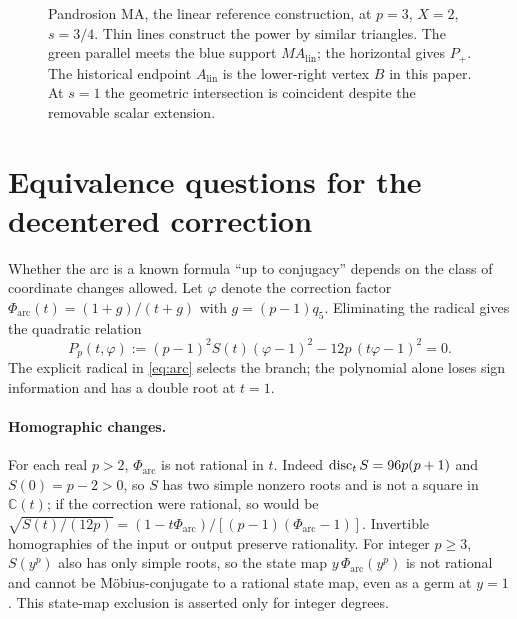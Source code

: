 \begin{figure}[h]
\centering\figMA
\caption{Pandrosion MA, the linear reference construction, at $p=3$, $X=2$, $s=3/4$. Thin lines
construct the power by similar triangles. The green parallel meets the blue support
$MA_{\mathrm{lin}}$; the horizontal gives $P_+$. The historical endpoint $A_{\mathrm{lin}}$ is the
lower-right vertex $B$ in this paper. At $s=1$ the geometric intersection is coincident despite the
removable scalar extension.}\label{fig:ma}
\end{figure}

\FloatBarrier
\section{Equivalence questions for the decentered correction}\label{app:equiv}

Whether the arc is a known formula ``up to conjugacy'' depends on the class of coordinate changes
allowed. Let $\varphi$ denote the correction factor $\Phi_{\mathrm{arc}}(t)=(1+g)/(t+g)$ with
$g=(p-1)q_5$. Eliminating the radical gives the quadratic relation
\begin{equation}\label{eq:quad}
P_p(t,\varphi):=(p-1)^{2}S(t)(\varphi-1)^{2}-12p\,(t\varphi-1)^{2}=0 .
\end{equation}
The explicit radical in \eqref{eq:arc} selects the branch; the polynomial alone loses sign information
and has a double root at $t=1$.

\paragraph{Homographic changes.}
For each real $p>2$, $\Phi_{\mathrm{arc}}$ is not rational in $t$. Indeed $\operatorname{disc}_tS=96p(p+1)$ and
$S(0)=p-2>0$, so $S$ has two simple nonzero roots and is not a square in $\mathbb{C}(t)$; if the
correction were rational, so would be
$\sqrt{S(t)/(12p)}=(1-t\Phi_{\mathrm{arc}})/[(p-1)(\Phi_{\mathrm{arc}}-1)]$. Invertible homographies of
the input or output preserve rationality. For integer $p\ge3$, $S(y^{p})$ also has only simple roots,
so the state map $y\,\Phi_{\mathrm{arc}}(y^{p})$ is not rational and cannot be M\"obius-conjugate to a
rational state map, even as a germ at $y=1$. This state-map exclusion is asserted only for integer
degrees.

